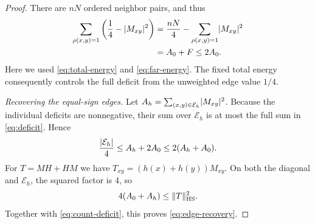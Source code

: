 \begin{proof}
There are $nN$ ordered neighbor pairs, and thus
\begin{align}
 \sum_{\rho(x,y)=1}\left(\frac14-\lvert M_{xy}\rvert^2\right)
 &=\frac{nN}{4}-\sum_{\rho(x,y)=1}\lvert M_{xy}\rvert^2\notag\\
 &=A_0+F\le2A_0.\label{eq:deficit}
\end{align}
Here we used \eqref{eq:total-energy} and \eqref{eq:far-energy}.
The fixed total energy consequently controls the full deficit from the
unweighted edge value $1/4$.

\smallskip\noindent\emph{Recovering the equal-sign edges.}
Let $A_h=\sum_{(x,y)\in\mathcal E_h}\lvert M_{xy}\rvert^2$.
Because the individual deficits are nonnegative, their sum over
$\mathcal E_h$ is at most the full sum in \eqref{eq:deficit}. Hence
\begin{equation}\label{eq:count-deficit}
 \frac{\lvert \mathcal E_h\rvert}4\le A_h+2A_0\le2(A_h+A_0).
\end{equation}
For $T=MH+HM$ we have
$T_{xy}=(h(x)+h(y))M_{xy}$. On both the diagonal and $\mathcal E_h$,
the squared factor is $4$, so
\[
 4(A_0+A_h)\le\lVert T\rVert_{\mathrm{HS}}^2.
\]
Together with \eqref{eq:count-deficit}, this proves
\eqref{eq:edge-recovery}.
\end{proof}
